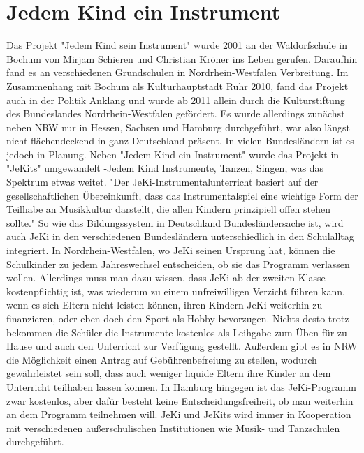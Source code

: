 \section{Jedem Kind ein Instrument}

Das Projekt "Jedem Kind sein Instrument" wurde 2001 an der Waldorfschule in
Bochum von Mirjam Schieren und Christian Kröner ins Leben gerufen. Daraufhin
fand es an verschiedenen Grundschulen in Nordrhein-Westfalen Verbreitung. Im
Zusammenhang mit Bochum als Kulturhauptstadt Ruhr 2010, fand das Projekt auch in
der Politik Anklang und wurde ab 2011 allein durch die Kulturstiftung des
Bundeslandes Nordrhein-Westfalen gefördert. Es wurde allerdings zunächst neben
NRW nur in Hessen, Sachsen und Hamburg durchgeführt, war also längst nicht
flächendeckend in ganz Deutschland präsent. In vielen Bundesländern ist es
jedoch in Planung. Neben "Jedem Kind ein Instrument" wurde das Projekt in
"JeKits" umgewandelt -Jedem Kind Instrumente, Tanzen, Singen, was das Spektrum
etwas weitet. "Der JeKi-Instrumentalunterricht basiert auf der
gesellschaftlichen Übereinkunft, dass das Instrumentalspiel eine wichtige Form
der Teilhabe an Musikkultur darstellt, die allen Kindern prinzipiell offen
stehen sollte."\autocite[94]{krupp_schleussner:jeki} So wie das Bildungssystem
in Deutschland Bundesländersache ist, wird auch JeKi in den verschiedenen
Bundesländern unterschiedlich in den Schulalltag integriert. In
Nordrhein-Westfalen, wo JeKi seinen Ursprung hat, können die Schulkinder zu
jedem Jahreswechsel entscheiden, ob sie das Programm verlassen wollen.
\autocite[95]{krupp_schleussner:jeki} Allerdings muss man dazu wissen, dass JeKi
ab der zweiten Klasse kostenpflichtig ist, was wiederum zu einem unfreiwilligen
Verzicht führen kann, wenn es sich Eltern nicht leisten können, ihren Kindern
JeKi weiterhin zu finanzieren, oder eben doch den Sport als Hobby bevorzugen.
Nichts desto trotz bekommen die Schüler die Instrumente kostenlos als Leihgabe
zum Üben für zu Hause und auch den Unterricht zur Verfügung gestellt. Außerdem
gibt es in NRW die Möglichkeit einen Antrag auf Gebührenbefreiung zu stellen,
wodurch gewährleistet sein soll, dass auch weniger liquide Eltern ihre Kinder an
dem Unterricht teilhaben lassen können. In Hamburg hingegen ist das
JeKi-Programm zwar kostenlos, aber dafür besteht keine Entscheidungsfreiheit, ob
man weiterhin an dem Programm teilnehmen will.
\autocite[95]{krupp_schleussner:jeki}
JeKi und JeKits wird immer in Kooperation mit verschiedenen außerschulischen
Institutionen wie Musik- und Tanzschulen durchgeführt.

